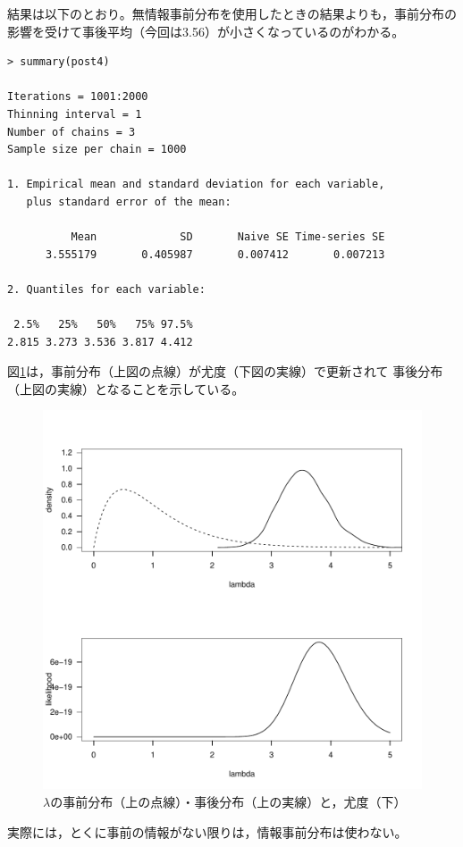 \documentclass[11pt,uplatex]{jsarticle}
\begin{document}
結果は以下のとおり。無情報事前分布を使用したときの結果よりも，事前分布の
影響を受けて事後平均（今回は3.56）が小さくなっているのがわかる。

\begin{lstlisting}
> summary(post4)

Iterations = 1001:2000
Thinning interval = 1 
Number of chains = 3 
Sample size per chain = 1000 

1. Empirical mean and standard deviation for each variable,
   plus standard error of the mean:

          Mean             SD       Naive SE Time-series SE 
      3.555179       0.405987       0.007412       0.007213 

2. Quantiles for each variable:

 2.5%   25%   50%   75% 97.5% 
2.815 3.273 3.536 3.817 4.412 

\end{lstlisting}

図\ref{prior_posterior}は，事前分布（上図の点線）が尤度（下図の実線）で更新されて
事後分布（上図の実線）となることを示している。

\begin{figure}[htbp]
	\begin{center}
		\includegraphics[bb=0 0 480 480, clip, width=280 bp]{example1-4.pdf}
	\end{center}
	\caption{$\lambda$の事前分布（上の点線）・事後分布（上の実線）と，尤度（下）}
	\label{prior_posterior}
\end{figure}

実際には，とくに事前の情報がない限りは，情報事前分布は使わない。
\end{document}
